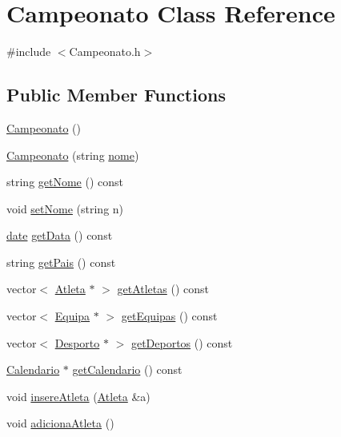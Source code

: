 \hypertarget{class_campeonato}{}\section{Campeonato Class Reference}
\label{class_campeonato}


{\ttfamily \#include $<$Campeonato.\+h$>$}

\subsection*{Public Member Functions}
\begin{DoxyCompactItemize}
\item 
\hyperlink{class_campeonato_aa14214a5863681b19922ad1515a3d14b}{Campeonato} ()
\item 
\hyperlink{class_campeonato_a6cdd161a2ea5ffd62810e8bfd4a4dc6c}{Campeonato} (string \hyperlink{class_campeonato_a670b0857b7a8bc3c5dbf0f927ee192fe}{nome})
\item 
string \hyperlink{class_campeonato_ae014ca753715e808b6d67c73f241f27d}{get\+Nome} () const 
\item 
void \hyperlink{class_campeonato_ab2654ae701c2418dab5c70aa4cd74b57}{set\+Nome} (string n)
\item 
\hyperlink{structdate}{date} \hyperlink{class_campeonato_ab78957e0803c30d318455d3d2b4f843b}{get\+Data} () const 
\item 
string \hyperlink{class_campeonato_a152f1d8474275af981214ed24663bf3f}{get\+Pais} () const 
\item 
vector$<$ \hyperlink{class_atleta}{Atleta} $\ast$ $>$ \hyperlink{class_campeonato_ab37dc7253ffed81cc81e90c569d83cf9}{get\+Atletas} () const 
\item 
vector$<$ \hyperlink{class_equipa}{Equipa} $\ast$ $>$ \hyperlink{class_campeonato_ac82ee7c13b116b71525cff9f557b45c2}{get\+Equipas} () const 
\item 
vector$<$ \hyperlink{class_desporto}{Desporto} $\ast$ $>$ \hyperlink{class_campeonato_aa07da18865320276e7ea4506cc81d8fe}{get\+Deportos} () const 
\item 
\hyperlink{class_calendario}{Calendario} $\ast$ \hyperlink{class_campeonato_afb142b85e3413714cb1eecfc3e474f5c}{get\+Calendario} () const 
\item 
void \hyperlink{class_campeonato_a72a3e9bea86e4f5d1a0029296bd10824}{insere\+Atleta} (\hyperlink{class_atleta}{Atleta} \&a)
\item 
void \hyperlink{class_campeonato_a7d63444db444c0d0de2a78db7fbcc20d}{adiciona\+Atleta} ()

\end{DoxyCompactItemize}
